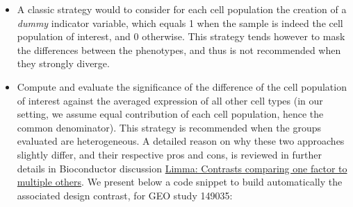 \begin{itemize}
\item
  A classic strategy would to consider for each cell population the creation of a \emph{dummy} indicator variable, which equals 1 when the sample is indeed the cell population of interest, and 0 otherwise. This strategy tends however to mask the differences between the phenotypes, and thus is not recommended when they strongly diverge.
\item
  Compute and evaluate the significance of the difference of the cell population of interest against the averaged expression of all other cell types (in our setting, we assume equal contribution of each cell population, hence the common denominator). This strategy is recommended when the groups evaluated are heterogeneous. A detailed reason on why these two approaches slightly differ, and their respective pros and cons, is reviewed in further details in Bioconductor discussion \href{https://support.bioconductor.org/p/26251/}{Limma: Contrasts comparing one factor to multiple others}. We present below a code snippet to build automatically the associated design contrast, for GEO study 149035:
\end{itemize}

